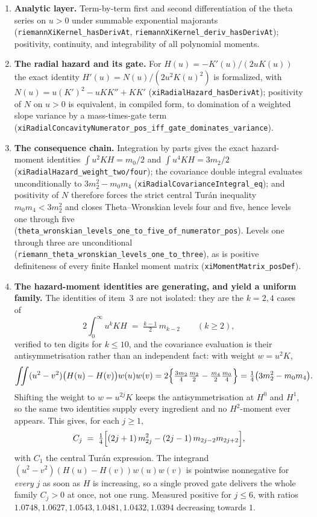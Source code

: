 \documentclass[11pt]{article}
\theoremstyle{plain}
\theoremstyle{definition}
\theoremstyle{remark}
\begin{document}
\begin{enumerate}
\item \textbf{Analytic layer.}  Term-by-term first and second differentiation
of the theta series on $u>0$ under summable exponential majorants
(\texttt{riemannXiKernel\_hasDerivAt},
\texttt{riemannXiKernel\_deriv\_hasDerivAt}); positivity, continuity, and
integrability of all polynomial moments.
\item \textbf{The radial hazard and its gate.}  For
$H(u)=-K'(u)/(2uK(u))$ the exact identity
$H'(u)=N(u)/(2u^2K(u)^2)$ is formalized, with
$N(u)=u(K')^2-uKK''+KK'$
(\texttt{xiRadialHazard\_hasDerivAt}); positivity of $N$ on $u>0$ is
equivalent, in compiled form, to domination of a weighted slope variance by a
mass-times-gate term
(\texttt{xiRadialConcavityNumerator\_pos\_iff\_gate\_dominates\_variance}).
\item \textbf{The consequence chain.}  Integration by parts gives the exact
hazard-moment identities
$\int u^2KH=m_0/2$ and $\int u^4KH=3m_2/2$
(\texttt{xiRadialHazard\_weight\_two/four}); the covariance double integral
evaluates unconditionally to $3m_2^2-m_0m_4$
(\texttt{xiRadialCovarianceIntegral\_eq}); and positivity of $N$ therefore
forces the strict central Tur\'an inequality $m_0m_4<3m_2^2$ and closes
Theta--Wronskian levels four and five, hence levels one through five
(\texttt{theta\_wronskian\_levels\_one\_to\_five\_of\_numerator\_pos}).
Levels one through three are unconditional
(\texttt{riemann\_theta\_wronskian\_levels\_one\_to\_three}), as is positive
definiteness of every finite Hankel moment matrix
(\texttt{xiMomentMatrix\_posDef}).
\item \textbf{The hazard-moment identities are generating, and yield a
uniform family.}  The identities of item~3 are not isolated: they are the
$k=2,4$ cases of
\[
  2\!\int_0^\infty\! u^{k}KH \;=\; \tfrac{k-1}{2}\,m_{k-2}
  \qquad(k\ge2),
\]
verified to ten digits for $k\le10$, and the covariance evaluation is their
antisymmetrisation rather than an independent fact: with weight $w=u^{2}K$,
\[
  \iint (u^2-v^2)\bigl(H(u)-H(v)\bigr)w(u)w(v)
  = 2\Bigl\{\tfrac{3m_2}{4}\tfrac{m_2}{2}-\tfrac{m_4}{2}\tfrac{m_0}{4}\Bigr\}
  = \tfrac{1}{4}\bigl(3m_2^2-m_0m_4\bigr).
\]
Shifting the weight to $w=u^{2j}K$ keeps the antisymmetrisation at $H^0$ and
$H^1$, so the same two identities supply every ingredient and no
$H^{2}$-moment ever appears.  This gives, for each $j\ge1$,
\[
  C_j \;=\; \tfrac14\Bigl[(2j+1)\,m_{2j}^{2}-(2j-1)\,m_{2j-2}m_{2j+2}\Bigr],
\]
with $C_1$ the central Tur\'an expression.  The integrand
$(u^2-v^2)(H(u)-H(v))w(u)w(v)$ is pointwise nonnegative for \emph{every} $j$
as soon as $H$ is increasing, so a single proved gate delivers the whole
family $C_j>0$ at once, not one rung.  Measured positive for $j\le6$, with
ratios $1.0748,1.0627,1.0543,1.0481,1.0432,1.0394$ decreasing towards $1$.


\end{enumerate}
\end{document}
